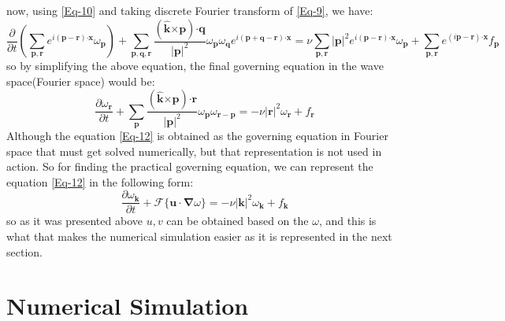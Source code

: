 \documentclass[12pt]{article}
\def\dotp{\bm{\cdot}}
\def\crossp{\bm{\times}}
\def\grad{\bm{\nabla}}
\def\p{\bm{p}}
\def\q{\bm{q}}
\def\r{\bm{r}}
\def\k{\bm{k}}
\def\u{\bm{u}}
\def\x{\bm{x}}
\def\eK{\bm{\hat{k}}}
\begin{document}
%
now, using \eqref{Eq-10} and taking discrete Fourier transform of \eqref{Eq-9}, we have:
%
\begin{equation}\label{Eq-11}
\frac{\partial}{\partial t}({\sum_{\p,\r}{e^{i(\p-\r)\dotp\x}\omega_{\p}}}) + \sum_{\p,\q,\r}{\frac{(\eK\crossp\p)\dotp\q}{|\p|^2}\omega_{\p}\omega_{\q}e^{i(\p+\q-\r)\dotp\x}}= \nu\sum_{\p,\r}{|\p|^2e^{i(\p-\r)\dotp\x}\omega_{\p}} + \sum_{\p,\r}{e^{(i\p-\r)\dotp\x}f_{\p}}
\end{equation}
%
so by simplifying the above equation, the final governing equation in the wave space(Fourier space) would be:
%
\begin{equation}\label{Eq-12}
\frac{\partial\omega_{\r}}{\partial t} + \sum_{\p}{\frac{(\eK\crossp\p)\dotp\r}{|\p|^2}\omega_{\p}\omega_{\r-\p}}= -\nu{|\r|}^2\omega_{\r} + f_{\r}
\end{equation}
%
Although the equation \eqref{Eq-12} is obtained as the governing equation in Fourier space that must get solved numerically, but that representation is not used in action. So for finding the practical governing equation, we can represent the equation \eqref{Eq-12} in the following form:
%
\begin{equation}\label{Eq-13}
\frac{\partial\omega_{\k}}{\partial t} + \mathcal{F}\{\u\cdot\grad\omega\}= -\nu{|\k|}^2\omega_{\k} + f_{\k}
\end{equation}
%
so as it was presented above $u,v$ can be obtained based on the $\omega$, and this is what that makes the numerical simulation easier as it is represented in the next section.
%
\section{Numerical Simulation}
\end{document}
